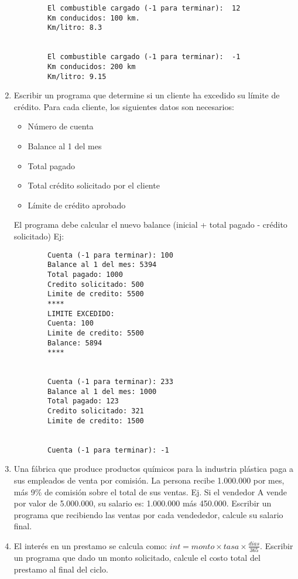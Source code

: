 \documentclass[12pt]{article}
\begin{document}
\begin{enumerate}
\begin{verbatim}
        El combustible cargado (-1 para terminar):  12
        Km conducidos: 100 km.
        Km/litro: 8.3


        El combustible cargado (-1 para terminar):  -1
        Km conducidos: 200 km
        Km/litro: 9.15

        \end{verbatim}

    \item Escribir un programa que determine si un cliente ha excedido su l\'imite de cr\'edito. Para cada cliente, 
        los siguientes datos son necesarios:
        \begin{itemize}
            \item N\'umero de cuenta
            \item Balance al 1 del mes
            \item Total pagado
            \item Total cr\'edito solicitado por el cliente
            \item L\'imite de cr\'edito aprobado
        \end{itemize}

        El programa debe calcular el nuevo balance (inicial + total pagado -  cr\'edito solicitado)
        Ej:
        \begin{verbatim}
        Cuenta (-1 para terminar): 100
        Balance al 1 del mes: 5394
        Total pagado: 1000
        Credito solicitado: 500
        Limite de credito: 5500
        ****
        LIMITE EXCEDIDO:
        Cuenta: 100
        Limite de credito: 5500
        Balance: 5894
        ****


        Cuenta (-1 para terminar): 233
        Balance al 1 del mes: 1000
        Total pagado: 123
        Credito solicitado: 321
        Limite de credito: 1500
        

        Cuenta (-1 para terminar): -1
        \end{verbatim}

    \item Una f\'abrica que produce productos qu\'imicos para la industria pl\'astica paga a sus empleados de venta
        por comisi\'on. La persona recibe 1.000.000 por mes, m\'as 9\% de comisi\'on sobre el total de sus ventas. Ej.
        Si el vendedor A vende por valor de 5.000.000, su salario es: 1.000.000 m\'as 450.000. Escribir un programa que 
        recibiendo las ventas por cada vendededor, calcule su salario final.

    \item El inter\'es en un prestamo se calcula como:  $int = monto \times tasa \times \frac{dias}{365}$. Escribir un programa
        que  dado un monto solicitado, calcule el costo total del prestamo al final del ciclo.


\end{enumerate}
\end{document}
